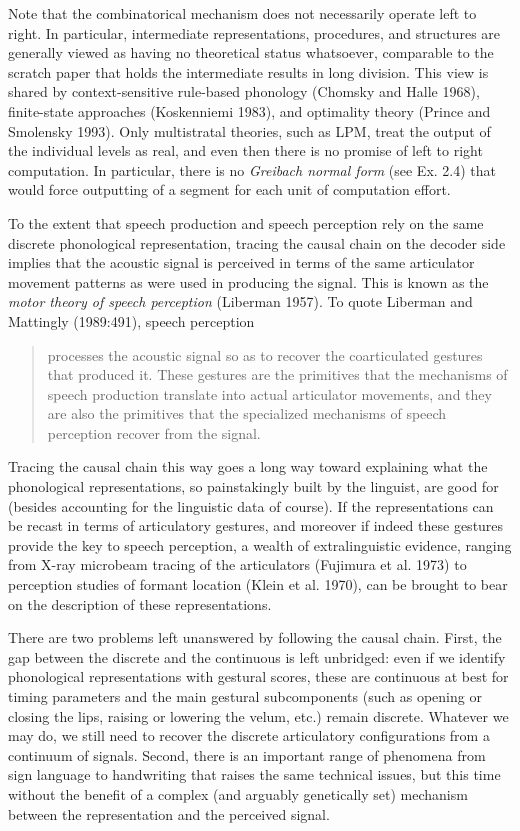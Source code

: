 Note that the combinatorical mechanism does not necessarily operate left to
right. In particular, intermediate representations, procedures, and structures
are generally viewed as having no theoretical status whatsoever, comparable to
the scratch paper that holds the intermediate results in long division. This
view is shared by context-sensitive rule-based phonology (Chomsky and Halle
1968), finite-state approaches (Koskenniemi 1983), and optimality theory
(Prince and Smolensky 1993). Only multistratal theories, such as LPM, treat
the output of the individual levels as real, and even then there is no
promise of left to right computation. In particular, there is no {\it Greibach
  normal form} (see Ex. 2.4) that would force
outputting of a segment for each unit of computation effort.

To the extent that speech production and speech perception rely on the same
discrete phonological representation, tracing the causal chain on the decoder
side implies that the acoustic signal is perceived in terms of the same
articulator movement patterns as were used in producing the signal. This is
known as the {\it motor theory of speech perception} (Liberman
1957).\nocite{Liberman:1957} To quote Liberman and Mattingly
(1989:491),\nocite{Liberman:1989} speech perception

\begin{quote}
processes the acoustic signal so as to recover the coarticulated gestures that
produced it. These gestures are the primitives that the mechanisms of speech
production translate into actual articulator movements, and they are also the
primitives that the specialized mechanisms of speech perception recover from
the signal.
\end{quote}

\noindent
Tracing the causal chain this way goes a long way toward explaining what the
phonological representations, so painstakingly built by the linguist, are good
for (besides accounting for the linguistic data of course). If the
representations can be recast in terms of articulatory gestures, and moreover
if indeed these gestures provide the key to speech perception, a wealth of
extralinguistic evidence, ranging from X-ray microbeam tracing of the
articulators (Fujimura et al. 1973)\nocite{Fujimura:1973} to perception
studies of formant location (Klein et al. 1970),\nocite{Klein:1970} can be
brought to bear on the description of these representations. 

There are two problems left unanswered by following the causal chain.  First,
the gap between the discrete and the continuous is left unbridged: even if we
identify phonological representations with gestural scores, these are
continuous at best for timing parameters and the main gestural subcomponents
(such as opening or closing the lips, raising or lowering the velum, etc.)
remain discrete. Whatever we may do, we still need to recover the discrete
articulatory configurations from a continuum of signals. Second, there is an
important range of phenomena from sign language to handwriting that raises the
same technical issues, but this time without the benefit of a complex (and
arguably genetically set) mechanism between the representation and the
perceived signal.

